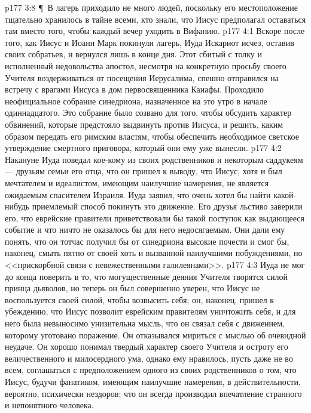 \vs p177 3:8 \P\ В лагерь приходило не много людей, поскольку его местоположение тщательно хранилось в тайне всеми, кто знали, что Иисус предполагал оставаться там вместо того, чтобы каждый вечер уходить в Вифанию.
\vs p177 4:1 Вскоре после того, как Иисус и Иоанн Марк покинули лагерь, Иуда Искариот исчез, оставив своих собратьев, и вернулся лишь в конце дня. Этот сбитый с толку и исполненный недовольства апостол, несмотря на конкретную просьбу своего Учителя воздерживаться от посещения Иерусалима, спешно отправился на встречу с врагами Иисуса в дом первосвященника Каиафы. Проходило неофициальное собрание синедриона, назначенное на это утро в начале одиннадцатого. Это собрание было созвано для того, чтобы обсудить характер обвинений, которые предстояло выдвинуть против Иисуса, и решить, каким образом передать его римским властям, чтобы обеспечить необходимое светское утверждение смертного приговора, который они ему уже вынесли.
\vs p177 4:2 Накануне Иуда поведал кое\hyp{}кому из своих родственников и некоторым саддукеям --- друзьям семьи его отца, что он пришел к выводу, что Иисус, хотя и был мечтателем и идеалистом, имеющим наилучшие намерения, не является ожидаемым спасителем Израиля. Иуда заявил, что очень хотел бы найти какой\hyp{}нибудь приемлемый способ покинуть это движение. Его друзья льстиво заверили его, что еврейские правители приветствовали бы такой поступок как выдающееся событие и что ничто не оказалось бы для него недосягаемым. Они дали ему понять, что он тотчас получил бы от синедриона высокие почести и смог бы, наконец, смыть пятно от своей хоть и вызванной наилучшими побуждениями, но <<прискорбной связи с невежественными галилеянами>>.
\vs p177 4:3 Иуда не мог до конца поверить в то, что могущественные деяния Учителя творятся силой принца дьяволов, но теперь он был совершенно уверен, что Иисус не воспользуется своей силой, чтобы возвысить себя; он, наконец, пришел к убеждению, что Иисус позволит еврейским правителям уничтожить себя, и для него была невыносимо унизительна мысль, что он связал себя с движением, которому уготовано поражение. Он отказывался мириться с мыслью об очевидной неудаче. Он хорошо понимал твердый характер своего Учителя и остроту его величественного и милосердного ума, однако ему нравилось, пусть даже не во всем, соглашаться с предположением одного из своих родственников о том, что Иисус, будучи фанатиком, имеющим наилучшие намерения, в действительности, вероятно, психически нездоров; что он всегда производил впечатление странного и непонятного человека.
